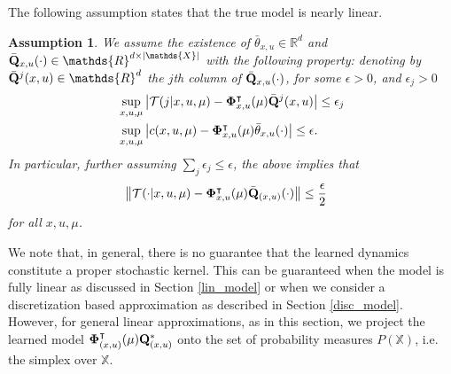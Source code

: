 \documentclass[twoside,11pt]{article}
\newtheorem{assumption}{Assumption}[section]
\begin{document}
The following assumption states that the true model is nearly linear.
\begin{assumption}\label{mis_ass}
We assume the existence of $\bar{\theta}_{x,u}\in \mathds{R}^d$ and $\bar{\bf Q}_{x,u}(\cdot) \in \mathds{R}^{d\times |\mathds{X}|}$ with the following property: denoting by $\bar{\bf Q}^j(x,u) \in\mathds{R}^d $ the $j$th column of  $\bar{\bf Q}_{x,u}(\cdot)$, for some $\epsilon>0$, and $\epsilon_j>0$ 
\begin{align}\label{lin_mis}
&\sup_{x,u,\mu}\left|\mathcal{T}(j|x,u,\mu) - {\bf \Phi}_{x,u}^\intercal(\mu)   \bar{\bf Q}^j{(x,u)}  \right|\leq \epsilon_j\nonumber\\
&\sup_{x,u,\mu}\left| c(x,u,\mu)- {\bf \Phi}_{x,u}^\intercal(\mu)   \bar{\bf \theta}_{x,u}(\cdot)  \right|\leq \epsilon.
\end{align}
In particular, further assuming  $\sum_j \epsilon_j \leq \epsilon$, the above implies that
\begin{align*}
&\left\|\mathcal{T}(\cdot|x,u,\mu) - {\bf \Phi}_{x,u}^\intercal(\mu)   \bar{\bf Q}_{(x,u)}(\cdot)  \right\|\leq \frac{\epsilon}{2}
\end{align*}
for all $x,u,\mu$.
\end{assumption}




We note that, in general, there is no guarantee that the learned dynamics constitute a proper stochastic kernel. This can be guaranteed when the model is fully linear as discussed in Section \ref{lin_model} or when we consider a discretization based approximation as described in Section \ref{disc_model}. However, for general linear approximations, as in this section, we project the learned model ${\bf \Phi}_{(x,u)}^\intercal(\mu){\bf Q}^*_{(x,u)}$ onto the set of probability measures $P(\mathds{X})$, i.e. the simplex over $\mathds{X}$.
\end{document}
